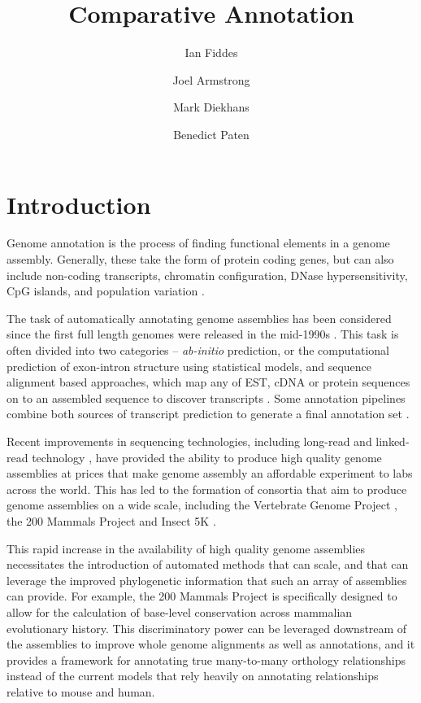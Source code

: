 \documentclass[fleqn,10pt]{wlscirep}
\title{Comparative Annotation}
\author[1,+]{Ian Fiddes}
\author[1,+]{Joel Armstrong}
\author[1,]{Mark Diekhans}
\author[1,*]{Benedict Paten}
\affil[1]{UCSC}
\affil[*]{corresponding.author@email.example}
\affil[+]{these authors contributed equally to this work}
\begin{document}
\flushbottom
\maketitle

\thispagestyle{empty}


\section*{Introduction}

Genome annotation is the process of finding functional elements in a genome assembly. Generally, these take the form of protein coding genes, but can also include non-coding transcripts\cite{harrow2012gencode}, chromatin configuration, DNase hypersensitivity\cite{encode2004encode}, CpG islands, and population variation \cite{sherry2001dbsnp}.

The task of automatically annotating genome assemblies has been considered since the first full length genomes were released in the mid-1990s \cite{letovsky1998gdb,lukashin1998genemark,haussler1996generalized}. This task is often divided into two categories -- \textit{ab-initio} prediction, or the computational prediction of exon-intron structure using statistical models, and sequence alignment based approaches, which map any of EST, cDNA or protein sequences on to an assembled sequence to discover transcripts \cite{Aken01012016}. Some annotation pipelines combine both sources of transcript prediction to generate a final annotation set \cite{pruitt2006ncbi,cantarel2008maker}.

Recent improvements in sequencing technologies, including long-read \cite{gordon2016long} and linked-read technology \cite{10xassembly}, have provided the ability to produce high quality genome assemblies at prices that make genome assembly an affordable experiment to labs across the world. This has led to the formation of consortia that aim to produce genome assemblies on a wide scale, including the Vertebrate Genome Project \cite{haussler2009genome}, the 200 Mammals Project and Insect 5K \cite{robinson2011creating}.

This rapid increase in the availability of high quality genome assemblies necessitates the introduction of automated methods that can scale, and that can leverage the improved phylogenetic information that such an array of assemblies can provide. For example, the 200 Mammals Project is specifically designed to allow for the calculation of base-level conservation across mammalian evolutionary history. This discriminatory power can be leveraged downstream of the assemblies to improve whole genome alignments as well as annotations, and it provides a framework for annotating true many-to-many orthology relationships instead of the current models that rely heavily on annotating relationships relative to mouse and human.
\end{document}
